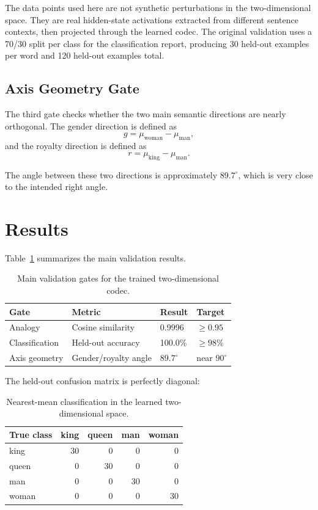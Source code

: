 \documentclass[11pt]{article}
\begin{document}
The data points used here are not synthetic perturbations in the two-dimensional
space. They are real hidden-state activations extracted from different sentence
contexts, then projected through the learned codec. The original validation uses
a 70/30 split per class for the classification report, producing 30 held-out
examples per word and 120 held-out examples total.

\subsection{Axis Geometry Gate}

The third gate checks whether the two main semantic directions are nearly
orthogonal. The gender direction is defined as
\[
  g = \mu_{\mathrm{woman}} - \mu_{\mathrm{man}},
\]
and the royalty direction is defined as
\[
  r = \mu_{\mathrm{king}} - \mu_{\mathrm{man}}.
\]

The angle between these two directions is approximately \(89.7^\circ\), which
is very close to the intended right angle.

\section{Results}

Table~\ref{tab:main-results} summarizes the main validation results.

\begin{table}[h]
\centering
\begin{tabular}{llll}
\toprule
Gate & Metric & Result & Target \\
\midrule
Analogy & Cosine similarity & 0.9996 & \(\geq 0.95\) \\
Classification & Held-out accuracy & 100.0\% & \(\geq 98\%\) \\
Axis geometry & Gender/royalty angle & \(89.7^\circ\) & near \(90^\circ\) \\
\bottomrule
\end{tabular}
\caption{Main validation gates for the trained two-dimensional codec.}
\label{tab:main-results}
\end{table}

The held-out confusion matrix is perfectly diagonal:

\begin{table}[h]
\centering
\begin{tabular}{lrrrr}
\toprule
True class & king & queen & man & woman \\
\midrule
king  & 30 & 0  & 0  & 0 \\
queen & 0  & 30 & 0  & 0 \\
man   & 0  & 0  & 30 & 0 \\
woman & 0  & 0  & 0  & 30 \\
\bottomrule
\end{tabular}
\caption{Nearest-mean classification in the learned two-dimensional space.}
\label{tab:confusion}
\end{table}
\end{document}
